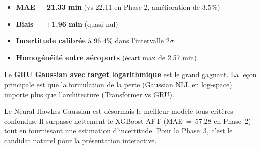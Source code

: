 \documentclass[11pt,a4paper]{article}
\newenvironment{keybox}[1]
  {\begin{tcolorbox}[colback=meteoGray,colframe=meteoBlue,title={\textbf{#1}},
    fonttitle=\small, boxrule=0.6pt, arc=3pt]}
  {\end{tcolorbox}}
\begin{document}
\begin{keybox}{Résultats clés de la Phase 2bis}
\begin{itemize}[nosep]
  \item \textbf{MAE = 21.33 min} (vs 22.11 en Phase 2, amélioration de 3.5\%)
  \item \textbf{Biais = +1.96 min} (quasi nul)
  \item \textbf{Incertitude calibrée} à 96.4\% dans l'intervalle 2$\sigma$
  \item \textbf{Homogénéité entre aéroports} (écart max de 2.57 min)
\end{itemize}
\end{keybox}

Le \textbf{GRU Gaussian avec target logarithmique} est le grand gagnant. La leçon principale est que la formulation de la perte (Gaussian NLL en log-space) importe plus que l'architecture (Transformer vs GRU).

Le Neural Hawkes Gaussian est désormais le meilleur modèle tous critères confondus. Il surpasse nettement le XGBoost AFT (MAE~=~57.28 en Phase~2) tout en fournissant une estimation d'incertitude. Pour la Phase~3, c'est le candidat naturel pour la présentation interactive.
\end{document}
